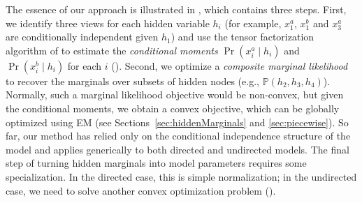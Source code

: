 The essence of our approach is illustrated in ,
which contains three steps.
First, we identify three views for each hidden variable $h_i$ (for example,
$x_1^a$, $x_1^b$ and $x_3^a$ are conditionally independent given $h_1$) and use
the tensor factorization algorithm of
\citet{anandkumar13tensor} to estimate the \emph{conditional
moments} $\Pr(x_i^a \mid h_i)$ and $\Pr(x_i^b \mid h_i)$ for each $i$ ().
Second, we optimize a \emph{composite marginal likelihood} to recover the marginals over
subsets of hidden nodes (e.g., $\mathbb P(h_2, h_3, h_4)$).
Normally, such a marginal likelihood objective would be non-convex,
but given the conditional moments, we obtain a convex objective,
which can be globally optimized using EM
(see Sections~\ref{sec:hiddenMarginals} and \ref{sec:piecewise}).
So far, our method has relied only on the conditional independence
structure of the model and applies generically to both directed
and undirected models.
The final step of turning hidden marginals into model parameters
requires some specialization.
In the directed case, this is simple normalization;
in the undirected case, we need to solve another convex optimization problem
().
